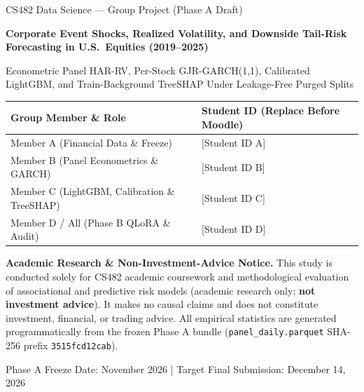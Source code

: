 \documentclass[11pt,a4paper]{article}
\begin{document}
\begin{titlepage}
\centering
\vspace*{1.2cm}
{\large CS482 Data Science --- Group Project (Phase A Draft)\par}
\vspace{0.8cm}
{\LARGE\bfseries Corporate Event Shocks, Realized Volatility, and Downside
Tail-Risk Forecasting in U.S.\ Equities (2019--2025)\par}
\vspace{0.4cm}
{\large Econometric Panel HAR-RV, Per-Stock GJR-GARCH(1,1), Calibrated
LightGBM, and Train-Background TreeSHAP Under Leakage-Free Purged Splits\par}
\vspace{1.2cm}

{\small
\begin{tabular}{ll}
\toprule
\textbf{Group Member \& Role} & \textbf{Student ID (Replace Before Moodle)} \\
\midrule
Member A (Financial Data \& Freeze) & [Student ID A] \\
Member B (Panel Econometrics \& GARCH) & [Student ID B] \\
Member C (LightGBM, Calibration \& TreeSHAP) & [Student ID C] \\
Member D / All (Phase B QLoRA \& Audit) & [Student ID D] \\
\bottomrule
\end{tabular}
}

\vspace{1.0cm}
\begin{minipage}{0.88\textwidth}
\small\raggedright
\textbf{Academic Research \& Non-Investment-Advice Notice.}
This study is conducted solely for CS482 academic coursework and methodological
evaluation of associational and predictive risk models (academic research only;
\textbf{not investment advice}). It makes no causal claims and does not
constitute investment, financial, or trading advice. All empirical statistics
are generated programmatically from the frozen Phase A bundle
(\texttt{panel\_daily.parquet} SHA-256 prefix \texttt{3515fcd12cab}).
\end{minipage}

\vfill
{\normalsize Phase A Freeze Date: November 2026 \quad | \quad
Target Final Submission: December 14, 2026\par}
\end{titlepage}
\end{document}
